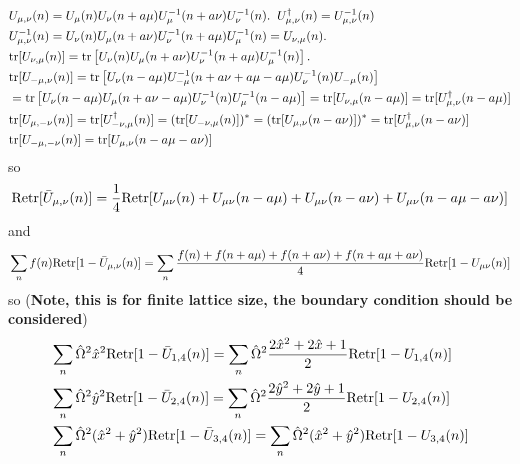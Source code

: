 \begin{equation}
\begin{split}
&U_{\mu, \nu}(n)= U_{\mu}(n)U_{\nu}(n+a\mu)U^{-1}_{\mu}(n+a\nu)U^{-1}_{\nu}(n).\;\;U^{\dagger}_{\mu, \nu}(n)=U^{-1}_{\mu, \nu}(n)\\
&U^{-1}_{\mu, \nu}(n)=U_{\nu}(n)U_{\mu}(n+a\nu)U^{-1}_{\nu}(n+a\mu)U^{-1}_{\mu}(n)=U_{\nu, \mu}(n).\\
&{\rm tr}[U_{\nu, \mu}(n)]= {\rm tr}\left[U_{\nu}(n)U_{\mu}(n+a\nu)U^{-1}_{\nu}(n+a\mu)U^{-1}_{\mu}(n)\right].\\
&{\rm tr}[U_{-\mu, \nu}(n)]= {\rm tr}\left[U_{\nu}(n-a\mu)U^{-1}_{-\mu}(n+a\nu+a\mu-a\mu)U^{-1}_{\nu}(n)U_{-\mu}(n)\right]\\
&={\rm tr}\left[U_{\nu}(n-a\mu)U_{\mu}(n+a\nu-a\mu)U^{-1}_{\nu}(n)U^{-1}_{\mu}(n-a\mu)\right]={\rm tr}[U_{\nu, \mu}(n-a\mu)]={\rm tr}[U^{\dagger}_{\mu, \nu}(n-a\mu)]\\
&{\rm tr}[U_{\mu, -\nu}(n)]={\rm tr}[U^{\dagger}_{-\nu, \mu}(n)]=({\rm tr}[U_{-\nu, \mu}(n)])^*=({\rm tr}[U_{\mu, \nu}(n-a\nu)])^*={\rm tr}[U^{\dagger}_{\mu, \nu}(n-a\nu)]\\
&{\rm tr}[U_{-\mu, -\nu}(n)]={\rm tr}[U_{\mu, \nu}(n-a\mu-a\nu)]
\end{split}
\end{equation}
so
\begin{equation}
\begin{split}
&{\rm Retr}[\bar{U}_{\mu, \nu}(n)]=\frac{1}{4}{\rm Retr}[U_{\mu\nu}(n)+U_{\mu\nu}(n-a\mu)+U_{\mu\nu}(n-a\nu)+U_{\mu\nu}(n-a\mu-a\nu)]\\
\end{split}
\end{equation}
and
\begin{equation}
\begin{split}
&\sum _n f(n){\rm Retr}[1-\bar{U}_{\mu, \nu}(n)]=\sum _n\frac{f(n)+f(n+a\mu)+f(n+a\nu)+f(n+a\mu+a\nu)}{4}{\rm Retr}[1-U_{\mu\nu}(n)]\\
\end{split}
\end{equation}
so (\textbf{Note, this is for finite lattice size, the boundary condition should be considered})
\begin{equation}
\begin{split}
&\sum _n \hat{\Omega}^2\hat{x}^2{\rm Retr}[1-\bar{U}_{1, 4}(n)]=\sum _n\hat{\Omega}^2\frac{2\hat{x}^2+2\hat{x}+1}{2}{\rm Retr}[1-U_{1,4}(n)]\\
&\sum _n \hat{\Omega}^2\hat{y}^2{\rm Retr}[1-\bar{U}_{2, 4}(n)]=\sum _n\hat{\Omega}^2\frac{2\hat{y}^2+2\hat{y}+1}{2}{\rm Retr}[1-U_{2,4}(n)]\\
&\sum _n \hat{\Omega}^2(\hat{x}^2+\hat{y}^2){\rm Retr}[1-\bar{U}_{3, 4}(n)]=\sum _n\hat{\Omega}^2(\hat{x}^2+\hat{y}^2){\rm Retr}[1-U_{3,4}(n)]\\
\end{split}
\end{equation}
